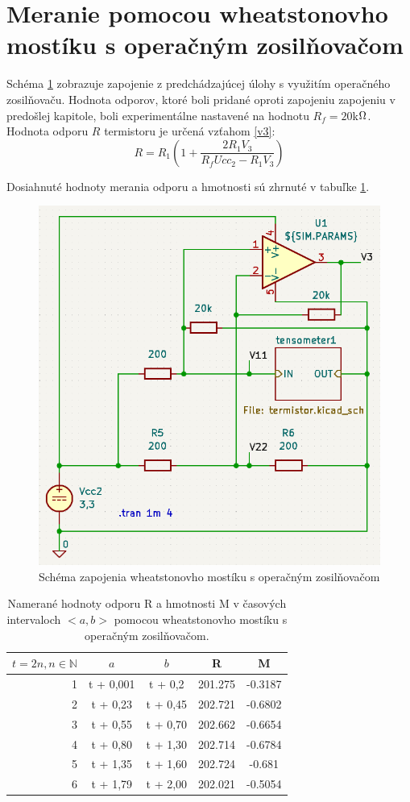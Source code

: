 \section{Meranie pomocou wheatstonovho mostíku s operačným zosilňovačom}
\label{c}
Schéma \ref{fig:3} zobrazuje zapojenie z predchádzajúcej úlohy s využitím operačného zosilňovaču.
Hodnota odporov, ktoré boli pridané oproti zapojeniu zapojeniu v predošlej kapitole, boli experimentálne nastavené na hodnotu $R_f = 20$k$\ohm$. Hodnota odporu $R$ termistoru je určená vzťahom \ref{v3}:
\begin{equation}
    \label{v3}
    R = R_1(1+\frac{2R_1V_3}{R_fUcc_2-R_1V_3})
\end{equation}

Dosiahnuté hodnoty merania odporu a hmotnosti sú zhrnuté v tabuľke \ref{t3}.
\begin{figure}[H]
    \centering
    \includegraphics[width=0.5\linewidth]{fig/triS.png}
    \caption{Schéma zapojenia wheatstonovho mostíku s operačným zosilňovačom}
    \label{fig:3}
\end{figure}
\begin{table}[H]
    \centering
    \begin{tabular}{|r|c|c|c|c|}
        \hline
         $t = 2n , n \in \mathbb{N}$ &  $a$ &  $b$ & R &M\\
        \hline
         1&  t + 0,001&  t + 0,2& 201.275&-0.3187\\
        \hline
         2&  t + 0,23&  t + 0,45& 202.721&-0.6802\\
        \hline
         3&  t + 0,55&  t + 0,70& 202.662&-0.6654\\
        \hline
         4&  t + 0,80&  t + 1,30& 202.714&-0.6784\\
        \hline
         5&  t + 1,35&  t + 1,60& 202.724&-0.681\\
        \hline
         6&  t + 1,79&  t + 2,00& 202.021&-0.5054\\
        \hline
    \end{tabular}
    \caption{Namerané hodnoty odporu R a hmotnosti M v časových intervaloch $<a,b>$ pomocou wheatstonovho mostíku s operačným zosilňovačom.}
    \label{t3}
\end{table}
